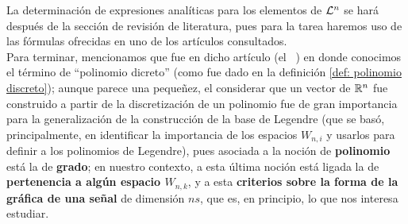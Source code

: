 La determinación de expresiones analíticas para los
elementos de $\mathcal{L}^{n}$ se hará después de la sección
de revisión de literatura, pues para la tarea haremos uso de las 
fórmulas ofrecidas en uno de los artículos consultados. \\

Para terminar, mencionamos que fue en dicho artículo
(el ~\cite{Neuman})
en donde conocimos el término de ``polinomio dicreto''
(como fue dado en la definición \ref{def: polinomio discreto});
aunque parece una pequeñez, el considerar que
un vector de $\mathbb{R}^{n}$ fue construido a partir
de la discretización de un polinomio fue de gran importancia
para la generalización de la construcción de la base de Legendre
(que se basó, principalmente,
en identificar la importancia de
los espacios $W_{n,i}$ y usarlos para definir
a los polinomios de Legendre),
pues asociada a la noción de \textbf{polinomio} está la de \textbf{grado}; 
en nuestro
contexto, a esta última noción está ligada la de \textbf{pertenencia a
algún espacio $W_{n,k}$}, y a esta \textbf{criterios sobre la forma de la
gráfica de una señal}
de dimensión $ns$, que es, en principio, lo que nos interesa estudiar.
